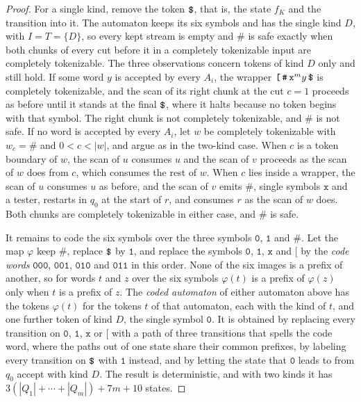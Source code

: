 \documentclass[11pt,a4paper]{article}
\theoremstyle{definition}
\theoremstyle{plain}
\newcommand{\code}[1]{\texttt{#1}}
\begin{document}
\begin{proof}
For a single kind, remove the token $\code{\symbol{36}}$, that is, the state $f_K$ and the transition into it. The
automaton keeps its six symbols and has the single kind $D$, with $I = T = \{D\}$, so every kept stream is empty and
$\code{\#}$ is safe exactly when both chunks of every cut before it in a completely tokenizable input are completely
tokenizable. The three observations concern tokens of kind $D$ only and still hold. If some word $y$ is accepted by
every $A_i$, the wrapper $\code{[}\,\code{\#}\,\code{x}^m y\,\code{\symbol{36}}$ is completely tokenizable, and the scan
of its right chunk at the cut $c = 1$ proceeds as before until it stands at the final $\code{\symbol{36}}$, where it
halts because no token begins with that symbol. The right chunk is not completely tokenizable, and $\code{\#}$ is not
safe. If no word is accepted by every $A_i$, let $w$ be completely tokenizable with $w_c = \code{\#}$ and $0 < c < |w|$,
and argue as in the two-kind case. When $c$ is a token boundary of $w$, the scan of $u$ consumes $u$ and the scan of $v$
proceeds as the scan of $w$ does from $c$, which consumes the rest of $w$. When $c$ lies inside a wrapper, the scan of
$u$ consumes $u$ as before, and the scan of $v$ emits $\code{\#}$, single symbols $\code{x}$ and a tester, restarts in
$q_0$ at the start of $r$, and consumes $r$ as the scan of $w$ does. Both chunks are completely tokenizable in either
case, and $\code{\#}$ is safe.

It remains to code the six symbols over the three symbols $\code{0}$, $\code{1}$ and $\code{\#}$. Let the map $\varphi$
keep $\code{\#}$, replace $\code{\symbol{36}}$ by $\code{1}$, and replace the symbols $\code{0}$, $\code{1}$, $\code{x}$
and $\code{[}$ by the \emph{code words} $\code{000}$, $\code{001}$, $\code{010}$ and $\code{011}$ in this order. None of
the six images is a prefix of another, so for words $t$ and $z$ over the six symbols $\varphi(t)$ is a prefix of
$\varphi(z)$ only when $t$ is a prefix of $z$. The \emph{coded automaton} of either automaton above has the tokens
$\varphi(t)$ for the tokens $t$ of that automaton, each with the kind of $t$, and one further token of kind $D$, the
single symbol $\code{0}$. It is obtained by replacing every transition on $\code{0}$, $\code{1}$, $\code{x}$ or
$\code{[}$ with a path of three transitions that spells the code word, where the paths out of one state share their
common prefixes, by labeling every transition on $\code{\symbol{36}}$ with $\code{1}$ instead, and by letting the state
that $\code{0}$ leads to from $q_0$ accept with kind $D$. The result is deterministic, and with two kinds it has
$3(|Q_1| + \cdots + |Q_m|) + 7m + 10$ states.


\end{proof}
\end{document}
